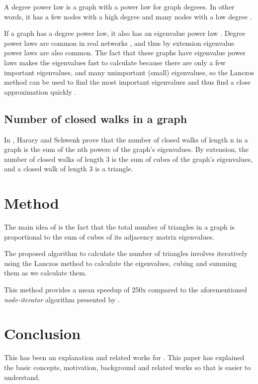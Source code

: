 \documentclass{acm_proc_article-sp}
\begin{document}
A degree power law is a graph with a power law for graph degrees. In other
words, it has a few nodes with a high degree and many nodes with a low degree
\cite{mihail}.

If a graph has a degree power law, it also has an eigenvalue power law
\cite{mihail}. Degree power laws are common in real networks \cite{original},
and thus by extension eigenvalue power laws are also common. The fact that
these graphs have eigenvalue power laws makes the eigenvalues fast to calculate
because there are only a few important eigenvalues, and many unimportant
(small) eigenvalues, so the Lanczos method can be used to find the most
important eigenvalues and thus find a close approximation quickly \cite{original}.

\subsection{Number of closed walks in a graph}
In \cite{harary}, Harary and Schwenk prove that the number of closed walks of
length n in a graph is the sum of the nth powers of the graph's eigenvalues. By
extension, the number of closed walks of length 3 is the sum of cubes of the
graph's eigenvalues, and a closed walk of length 3 is a triangle.

\section{Method}
The main idea of \cite{original} is the fact that the total number of triangles
in a graph is proportional to the sum of cubes of its adjacency matrix
eigenvalues.

The proposed algorithm to calculate the number of triangles involves
iteratively using the Lanczos method to calculate the eigenvalues, cubing and
summing them as we calculate them.

This method provides a mean speedup of 250x compared to the aforementioned
\textit{node-iterator} algorithm presented by \cite{schank:counting}.

\section{Conclusion}
This has been an explanation and related works for \cite{original}. This paper
has explained the basic concepts, motivation, background and related works so
that \cite{original} is easier to understand.

%

%
%
\end{document}
